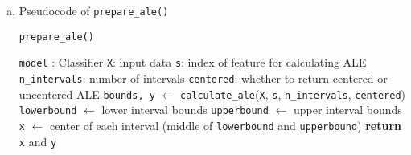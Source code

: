 {\begin{enumerate}[a)]
%

\item Pseudocode of  \texttt{prepare\_ale()}

\begin{algorithm}[h]
\caption{\texttt{prepare\_ale()}}
\begin{algorithmic}[1]
\Require \texttt{model} : Classifier 
\Require \texttt{X}: input data 
\Require \texttt{s}: index of feature for calculating ALE
\Require \texttt{n\_intervals}: number of intervals 
\Require \texttt{centered}: whether to return centered or uncentered ALE
\State \texttt{bounds, y} $\gets$ \texttt{calculate\_ale}(\texttt{X}, \texttt{s}, \texttt{n\_intervals}, \texttt{centered})
\State \texttt{lowerbound} $\gets$ lower interval bounds
\State \texttt{upperbound} $\gets$ upper interval bounds
\State \texttt{x} $\gets$ center of each interval (middle of \texttt{lowerbound} and \texttt{upperbound})
\State \textbf{return}  \texttt{x} and \texttt{y}
\end{algorithmic}
\end{algorithm}

%

%


\end{enumerate}
}